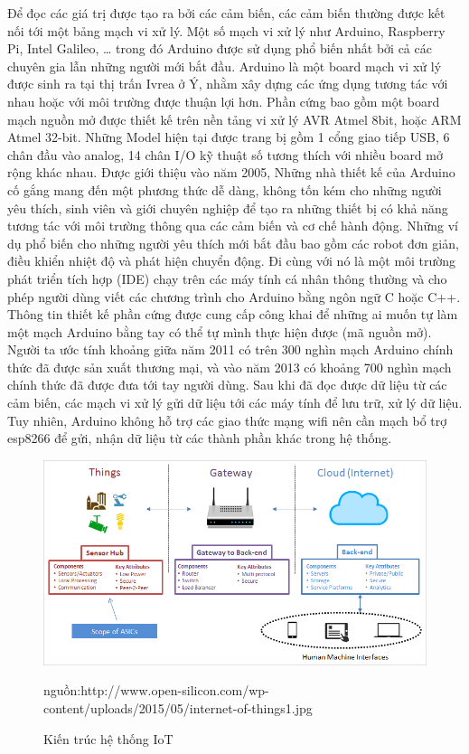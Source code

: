Để đọc các giá trị được tạo ra bởi các cảm biến, các cảm biến thường được kết nối tới một bảng mạch vi xử lý. Một số mạch vi xử lý như Arduino, Raspberry Pi, Intel Galileo, … trong đó Arduino được sử dụng phổ biến nhất bởi cả các chuyên gia lẫn những người mới bắt đầu. Arduino là một board mạch vi xử lý được sinh ra tại thị trấn Ivrea ở Ý, nhằm xây dựng các ứng dụng tương tác với nhau hoặc với môi trường được thuận lợi hơn. Phần cứng bao gồm một board mạch nguồn mở được thiết kế trên nền tảng vi xử lý AVR Atmel 8bit, hoặc ARM Atmel 32-bit. Những Model hiện tại được trang bị gồm 1 cổng giao tiếp USB, 6 chân đầu vào analog, 14 chân I/O kỹ thuật số tương thích với nhiều board mở rộng khác nhau. Được giới thiệu vào năm 2005, Những nhà thiết kế của Arduino cố gắng mang đến một phương thức dễ dàng, không tốn kém cho những người yêu thích, sinh viên và giới chuyên nghiệp để tạo ra những thiết bị có khả năng tương tác với môi trường thông qua các cảm biến và cơ chế hành động. Những ví dụ phổ biến cho những người yêu thích mới bắt đầu bao gồm các robot đơn giản, điều khiển nhiệt độ và phát hiện chuyển động. Đi cùng với nó là một môi trường phát triển tích hợp (IDE) chạy trên các máy tính cá nhân thông thường và cho phép người dùng viết các chương trình cho Arduino bằng ngôn ngữ C hoặc C++. Thông tin thiết kế phần cứng được cung cấp công khai để những ai muốn tự làm một mạch Arduino bằng tay có thể tự mình thực hiện được (mã nguồn mở). Người ta ước tính khoảng giữa năm 2011 có trên 300 nghìn mạch Arduino chính thức đã được sản xuất thương mại, và vào năm 2013 có khoảng 700 nghìn mạch chính thức đã được đưa tới tay người dùng. 
Sau khi đã đọc được dữ liệu từ các cảm biến, các mạch vi xử lý gửi dữ liệu tới các máy tính để lưu trữ, xử lý dữ liệu. Tuy nhiên, Arduino không hỗ trợ các giao thức mạng wifi nên cần mạch bổ trợ esp8266 để gửi, nhận dữ liệu từ các thành phần khác trong hệ thống.
\begin{figure}[h!]
	\center
	\includegraphics[scale=0.6]{image/internet-of-things1}
	\caption{Kiến trúc hệ thống IoT}
	nguồn:http://www.open-silicon.com/wp-content/uploads/2015/05/internet-of-things1.jpg
	\label{fig:iot}
\end{figure}
